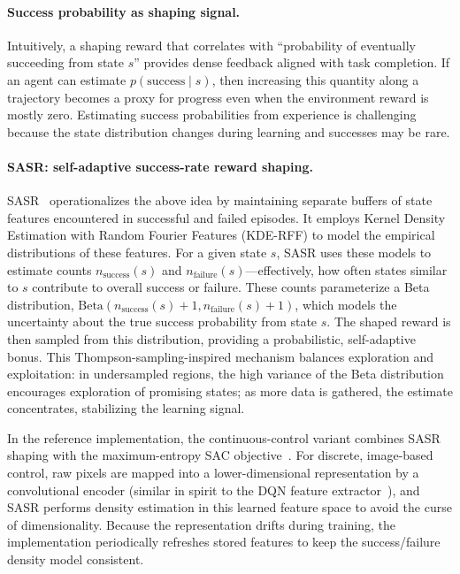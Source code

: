 \documentclass{article}
\begin{document}
\paragraph{Success probability as shaping signal.}
Intuitively, a shaping reward that correlates with ``probability of eventually succeeding from state \(s\)'' provides dense feedback aligned with task completion. If an agent can estimate \(p(\text{success} \mid s)\), then increasing this quantity along a trajectory becomes a proxy for progress even when the environment reward is mostly zero. Estimating success probabilities from experience is challenging because the state distribution changes during learning and successes may be rare.

\paragraph{SASR: self-adaptive success-rate reward shaping.}
SASR~\citep{ma2025sasr} operationalizes the above idea by maintaining separate buffers of state features encountered in successful and failed episodes. It employs Kernel Density Estimation with Random Fourier Features (KDE-RFF) to model the empirical distributions of these features. For a given state $s$, SASR uses these models to estimate counts $n_{\text{success}}(s)$ and $n_{\text{failure}}(s)$---effectively, how often states similar to $s$ contribute to overall success or failure. These counts parameterize a Beta distribution, $\mathrm{Beta}(n_{\text{success}}(s) + 1, n_{\text{failure}}(s) + 1)$, which models the uncertainty about the true success probability from state $s$. The shaped reward is then sampled from this distribution, providing a probabilistic, self-adaptive bonus. This Thompson-sampling-inspired mechanism balances exploration and exploitation: in undersampled regions, the high variance of the Beta distribution encourages exploration of promising states; as more data is gathered, the estimate concentrates, stabilizing the learning signal.

In the reference implementation, the continuous-control variant combines SASR shaping with the maximum-entropy SAC objective~\citep{haarnoja2018sac}. For discrete, image-based control, raw pixels are mapped into a lower-dimensional representation by a convolutional encoder (similar in spirit to the DQN feature extractor~\citep{mnih2015dqn}), and SASR performs density estimation in this learned feature space to avoid the curse of dimensionality. Because the representation drifts during training, the implementation periodically refreshes stored features to keep the success/failure density model consistent.
\end{document}

